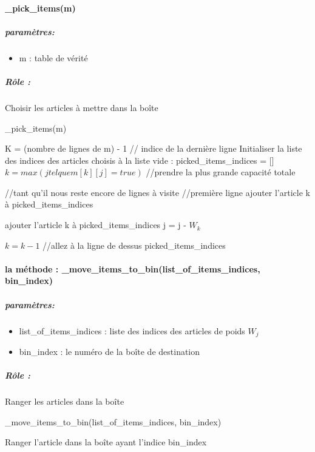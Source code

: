 \documentclass[12pt]{article}
\begin{document}
 \paragraph{\_pick\_items(m)}
\subparagraph{paramètres:}
\begin{itemize}
    \item m : table de vérité
\end{itemize}
\subparagraph{Rôle :}
Choisir les articles à mettre dans la boîte 
\begin{algorithm}[H]
    \caption{\_pick\_items(m)}
    \begin{algorithmic} 
    \STATE K = (nombre de lignes de m) - 1 // indice de la dernière ligne
    \STATE Initialiser la liste des indices des articles choisis à la liste vide : picked\_items\_indices = []
        \STATE $k = max( j tel que m[k][j]=true)$ //prendre la plus grande capacité totale
          
    \ENDIF
        \STATE //tant qu’il nous reste encore de lignes à visite
                \STATE //première ligne
                \STATE ajouter l’article k à picked\_items\_indices
               
            \ELSE
                    \STATE ajouter l’article k à picked\_items\_indices
                    \STATE j = j - $W_k$

                \ENDIF
            \ENDIF
            \STATE  $k = k-1$ //allez à la ligne de dessus      
   \ENDWHILE
    \RETURN picked\_items\_indices
    \end{algorithmic} 
 \end{algorithm}
 \paragraph{la méthode : \_move\_items\_to\_bin(list\_of\_items\_indices, bin\_index)}
 \subparagraph{paramètres:}
 \begin{itemize}
     \item list\_of\_items\_indices : liste des indices des articles de poids $W_j$
     \item bin\_index : le numéro de la boîte de destination
 \end{itemize}
 \subparagraph{Rôle :}
 Ranger les articles dans la boîte 
 \begin{algorithm}[H]
     \caption{ \_move\_items\_to\_bin(list\_of\_items\_indices, bin\_index)}
     \begin{algorithmic} 
            \STATE Ranger l’article dans la boîte ayant l’indice bin\_index
        \ENDFOR
    \end{algorithmic} 
  \end{algorithm}
\end{document}
